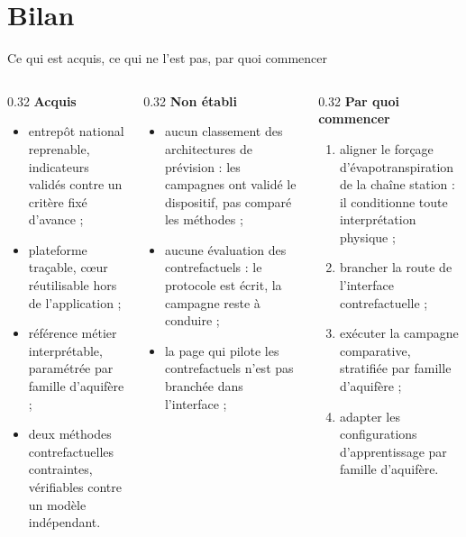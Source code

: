\documentclass[aspectratio=169,11pt]{beamer}
\begin{document}
\section{Bilan}
\begin{frame}{Ce qui est acquis, ce qui ne l'est pas, par quoi commencer}
\vspace{-4pt}

\begin{columns}[T]
\begin{column}{0.32\textwidth}
{\color{vertsobre}\bfseries Acquis}
\vspace{0.2em}
\footnotesize
\begin{itemize}\itemsep0.25em
  \item entrepôt national reprenable, indicateurs validés contre un critère fixé d'avance ;
  \item plateforme traçable, cœur réutilisable hors de l'application ;
  \item référence métier interprétable, paramétrée par famille d'aquifère ;
  \item deux méthodes contrefactuelles contraintes, vérifiables contre un modèle indépendant.
\end{itemize}
\end{column}

\begin{column}{0.32\textwidth}
{\color{rougesobre}\bfseries Non établi}
\vspace{0.2em}
\footnotesize
\begin{itemize}\itemsep0.25em
  \item aucun classement des architectures de prévision : les campagnes ont validé le dispositif, pas comparé
        les méthodes ;
  \item aucune évaluation des contrefactuels : le protocole est écrit, la campagne reste à
        conduire ;
  \item la page qui pilote les contrefactuels n'est pas branchée dans l'interface ;
\end{itemize}
\end{column}

\begin{column}{0.32\textwidth}
{\color{bleuprofond}\bfseries Par quoi commencer}
\vspace{0.2em}
\footnotesize
\begin{enumerate}\itemsep0.25em
  \item aligner le forçage d'évapotranspiration de la chaîne station : il conditionne toute
        interprétation physique ;
  \item brancher la route de l'interface contrefactuelle ;
  \item exécuter la campagne comparative, stratifiée par famille d'aquifère ;
  \item adapter les configurations d'apprentissage par famille d'aquifère.
\end{enumerate}


\end{column}
\end{columns}
\end{frame}
\end{document}
